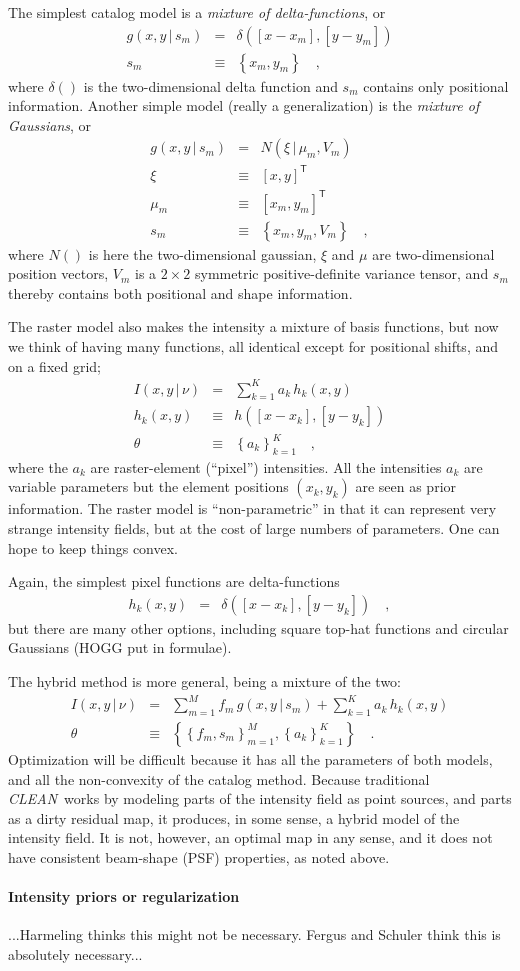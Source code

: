 \documentclass[12pt]{article}
\newcommand{\project}[1]{\textsl{#1}}
\newcommand{\CLEAN}{\project{CLEAN}}
\newcommand{\set}[1]{\left\{{#1}\right\}}
\newcommand{\given}{\,|\,}
\newcommand{\normal}{N}
\newcommand{\transpose}[1]{{#1}^{\!\mathsf{T}}}
\begin{document}
The simplest catalog model is a \emph{mixture of delta-functions}, or
\begin{eqnarray}
g(x,y\given s_m) &=& \delta([x-x_m], [y-y_m])
\\
s_m &\equiv& \set{x_m, y_m}
\quad,
\end{eqnarray}
where $\delta()$ is the two-dimensional delta function and $s_m$
contains only positional information.  Another simple model (really a
generalization) is the \emph{mixture of Gaussians}, or
\begin{eqnarray}
g(x,y\given s_m) &=& \normal(\xi\given\mu_m,V_m)
\\
\xi &\equiv& \transpose{[x, y]}
\\
\mu_m &\equiv& \transpose{[x_m, y_m]}
\\
s_m &\equiv& \set{x_m, y_m, V_m}
\quad,
\end{eqnarray}
where $\normal()$ is here the two-dimensional gaussian, $\xi$ and
$\mu$ are two-dimensional position vectors, $V_m$ is a $2\times 2$
symmetric positive-definite variance tensor, and $s_m$ thereby
contains both positional and shape information.

The raster model also makes the intensity a mixture of basis
functions, but now we think of having many functions, all identical
except for positional shifts, and on a fixed grid;
\begin{eqnarray}
I(x,y\given\nu) &=& \sum_{k=1}^K a_k\,h_k(x, y)
\\
h_k(x, y) &\equiv& h([x-x_k], [y-y_k])
\\
\theta &\equiv& \set{a_k}_{k=1}^K
\quad,
\end{eqnarray}
where the $a_k$ are raster-element (``pixel'') intensities.  All the
intensities $a_k$ are variable parameters but the element positions
$(x_k, y_k)$ are seen as prior information.  The raster model is
``non-parametric'' in that it can represent very strange intensity
fields, but at the cost of large numbers of parameters.  One can hope
to keep things convex.

Again, the simplest pixel functions are delta-functions
\begin{eqnarray}
h_k(x,y) &=& \delta([x-x_k], [y-y_k])
\quad,
\end{eqnarray}
but there are many other options, including square top-hat functions
and circular Gaussians (HOGG put in formulae).

The hybrid method is more general, being a mixture of the two:
\begin{eqnarray}
I(x,y\given\nu) &=& \sum_{m=1}^M f_m\,g(x,y\given s_m)
                  + \sum_{k=1}^K a_k\,h_k(x, y)
\\
\theta &\equiv& \set{\set{f_m, s_m}_{m=1}^M, \set{a_k}_{k=1}^K}
\quad.
\end{eqnarray}
Optimization will be difficult because it has all the parameters of
both models, and all the non-convexity of the catalog method.  Because
traditional \CLEAN\ works by modeling parts of the intensity field as
point sources, and parts as a dirty residual map, it produces, in some
sense, a hybrid model of the intensity field.  It is not, however, an
optimal map in any sense, and it does not have consistent beam-shape
(PSF) properties, as noted above.

\paragraph{Intensity priors or regularization}

...Harmeling thinks this might not be necessary.  Fergus and Schuler
think this is absolutely necessary...
\end{document}
